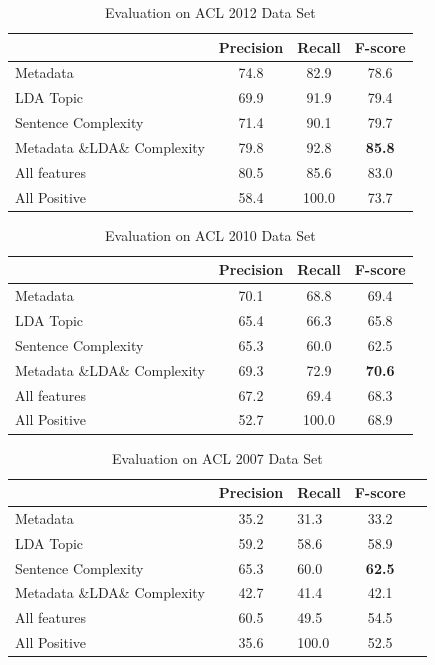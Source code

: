 \documentclass[11pt,letterpaper]{article}
\begin{document}
\begin{table}
\begin{center}
\begin{tabular}{|p{2cm}|c|c|c|}
\hline 
& \bf Precision & \bf Recall & \bf F-score \\ \hline
Metadata	& 74.8	& 82.9	& 78.6\\ \hline
LDA Topic &	69.9	&91.9&	79.4\\ \hline
Sentence Complexity	& 71.4	& 90.1 &	79.7\\ \hline
Metadata \&LDA\& Complexity	& 79.8	& 92.8 & \bf 85.8\\ \hline
All features	& 80.5	& 85.6	& 83.0\\ \hline
All Positive	& 58.4	& 100.0	& 73.7\\\hline
\end{tabular}
\end{center}
\caption{Evaluation on ACL 2012 Data Set}
\label{tab:2012}
\end{table}


\begin{table}
\begin{center}
\begin{tabular}{|p{2cm}|c|c|c|}
\hline 
& \bf Precision & \bf Recall & \bf F-score \\ \hline
Metadata	&70.1&68.8&69.4\\ \hline
LDA Topic &65.4&66.3&65.8\\ \hline
Sentence Complexity	&65.3&60.0&62.5\\ \hline
Metadata \&LDA\& Complexity	&69.3&72.9&\bf 70.6\\ \hline
All features	&67.2&69.4&68.3\\ \hline
All Positive	&52.7& 100.0	& 68.9\\\hline
\end{tabular}
\end{center}
\caption{Evaluation on ACL 2010 Data Set}
\label{tab:2010}
\end{table}

\begin{table}
\begin{center}
\begin{tabular}{|p{2cm}|cl|c|c|}
\hline 
& \bf Precision & \bf Recall & \bf F-score \\ \hline
Metadata	& 35.2	& 31.3	& 33.2\\ \hline
LDA Topic &	59.2	& 58.6&	58.9\\ \hline
Sentence Complexity	& 65.3	& 60.0 &	\bf 62.5\\ \hline
Metadata \&LDA\& Complexity	& 42.7	& 41.4 & 42.1\\ \hline
All features	& 60.5	& 49.5	& 54.5 \\ \hline
All Positive	& 35.6	& 100.0	& 52.5\\ \hline
\end{tabular}
\end{center}
\caption{Evaluation on ACL 2007 Data Set}
\label{tab:2007}
\end{table}
\end{document}
